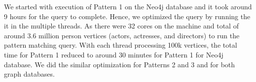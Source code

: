 We started with execution of Pattern 1 on the Neo4j database and it took around 9 hours for the query to complete. Hence, we optimized the query by running the it in the multiple threads. As there were 32 cores on the machine and total of around 3.6 million person vertices (actors, actresses, and directors) to run the pattern matching query. With each thread processing 100k vertices, the total time for Pattern 1 reduced to around 30 minutes for Pattern 1 for Neo4j database. We did the similar optimization for Patterns 2 and 3 and for both graph databases.

